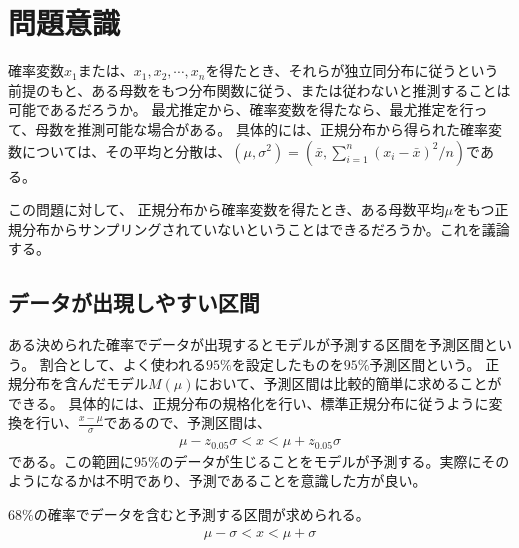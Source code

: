 
\section{問題意識}
確率変数$x_1$または、$x_1,x_2,\cdots,x_n$を得たとき、それらが独立同分布に従うという前提のもと、ある母数をもつ分布関数に従う、または従わないと推測することは可能であるだろうか。
最尤推定から、確率変数を得たなら、最尤推定を行って、母数を推測可能な場合がある。
具体的には、正規分布から得られた確率変数については、その平均と分散は、$(\mu,\sigma^2)=(\bar{x},\sum_{i=1}^{n} (x_i-\bar{x})^2/n)$である。

この問題に対して、
正規分布から確率変数を得たとき、ある母数平均$\mu$をもつ正規分布からサンプリングされていないということはできるだろうか。これを議論する。

\fi

\subsection{データが出現しやすい区間}
ある決められた確率でデータが出現するとモデルが予測する区間を予測区間という。
割合として、よく使われる$95\%$を設定したものを$95\%$予測区間という。
正規分布を含んだモデル$M(\mu)$において、予測区間は比較的簡単に求めることができる。
具体的には、正規分布の規格化を行い、標準正規分布に従うように変換を行い、$\frac{x-\mu}{\sigma}$であるので、予測区間は、
\begin{eqnarray*}
    \mu-z_{0.05}\sigma < x < \mu+z_{0.05}\sigma
\end{eqnarray*}
である。この範囲に$95\%$のデータが生じることをモデルが予測する。実際にそのようになるかは不明であり、予測であることを意識した方が良い。

$68\%$の確率でデータを含むと予測する区間が求められる。
\begin{eqnarray*}
    \mu-\sigma < x < \mu+\sigma
\end{eqnarray*}

